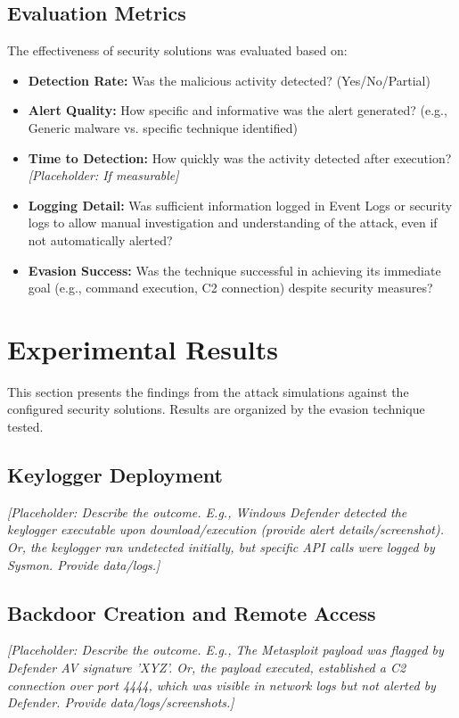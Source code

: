 \documentclass{ULBreport}
\begin{document}
\subsection{Evaluation Metrics}
The effectiveness of security solutions was evaluated based on:
\begin{itemize}
	\item \textbf{Detection Rate:} Was the malicious activity detected? (Yes/No/Partial)
	\item \textbf{Alert Quality:} How specific and informative was the alert generated? (e.g., Generic malware vs. specific technique identified)
	\item \textbf{Time to Detection:} How quickly was the activity detected after execution? \textit{[Placeholder: If measurable]}
	\item \textbf{Logging Detail:} Was sufficient information logged in Event Logs or security logs to allow manual investigation and understanding of the attack, even if not automatically alerted?
	\item \textbf{Evasion Success:} Was the technique successful in achieving its immediate goal (e.g., command execution, C2 connection) despite security measures?
\end{itemize}

\section*{Experimental Results}
This section presents the findings from the attack simulations against the configured security solutions. Results are organized by the evasion technique tested.

\subsection{Keylogger Deployment}
\textit{[Placeholder: Describe the outcome. E.g., Windows Defender detected the keylogger executable upon download/execution (provide alert details/screenshot). Or, the keylogger ran undetected initially, but specific API calls were logged by Sysmon. Provide data/logs.]}

\subsection{Backdoor Creation and Remote Access}
\textit{[Placeholder: Describe the outcome. E.g., The Metasploit payload was flagged by Defender AV signature 'XYZ'. Or, the payload executed, established a C2 connection over port 4444, which was visible in network logs but not alerted by Defender. Provide data/logs/screenshots.]}
\end{document}
